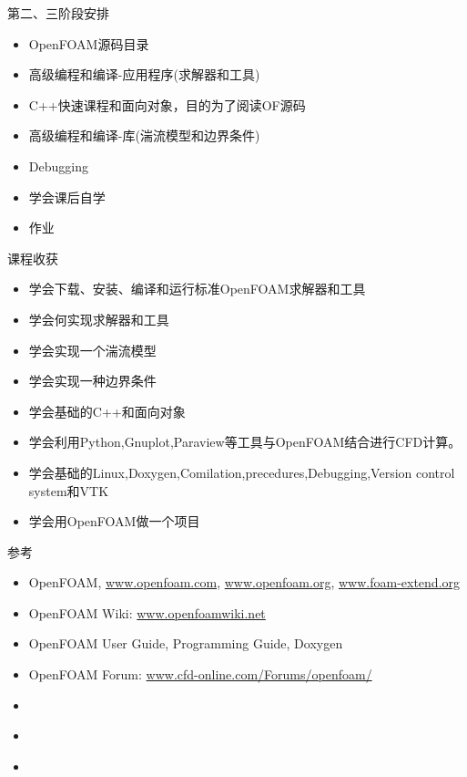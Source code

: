 \documentclass{beamer}
\begin{document}
\begin{frame}{第二、三阶段安排}
    \begin{itemize}
        \item OpenFOAM源码目录
        \item 高级编程和编译-应用程序(求解器和工具)
        \item C++快速课程和面向对象，目的为了阅读OF源码
        \item 高级编程和编译-库(湍流模型和边界条件)
        \item Debugging
        \item 学会课后自学
        \item 作业
    \end{itemize}
    
\end{frame}

\begin{frame}{课程收获}
    \begin{itemize}
        \item 学会下载、安装、编译和运行标准OpenFOAM求解器和工具
        \item 学会何实现求解器和工具
        \item 学会实现一个湍流模型
        \item 学会实现一种边界条件
        \item 学会基础的C++和面向对象
        \item 学会利用Python,Gnuplot,Paraview等工具与OpenFOAM结合进行CFD计算。
        \item 学会基础的Linux,Doxygen,Comilation,precedures,Debugging,Version control system和VTK
        \item 学会用OpenFOAM做一个项目
    \end{itemize}
    
\end{frame}

\begin{frame}{参考}
    \begin{itemize}
        \item OpenFOAM, \url{www.openfoam.com}, \url{www.openfoam.org}, \url{www.foam-extend.org}
        \item OpenFOAM Wiki: \url{www.openfoamwiki.net}
        \item OpenFOAM User Guide, Programming Guide, Doxygen
        \item OpenFOAM Forum: \url{www.cfd-online.com/Forums/openfoam/}
        \item \cite{ferziger2002computational}
        \item \cite{moukalled2016finite}
        \item \cite{versteeg2007introduction}
    \end{itemize}
    
\end{frame}
\end{document}
